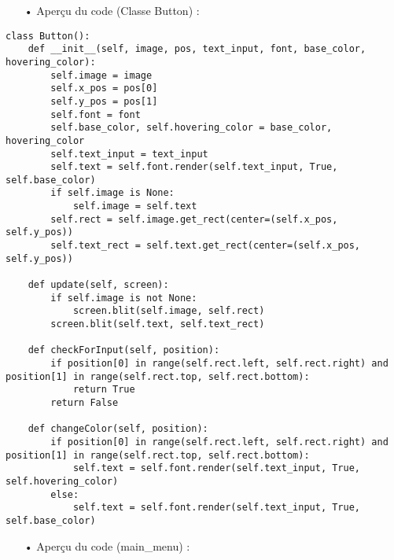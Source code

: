 	\begin{itemize}
	\color{blue}\item[•]Aperçu du code (Classe Button) :
	\end{itemize}
	
	\lstset{language=Python}
	\lstset{frame=lines}
	\lstset{basicstyle=\footnotesize}
	\begin{lstlisting}
class Button():
	def __init__(self, image, pos, text_input, font, base_color, hovering_color):
		self.image = image
		self.x_pos = pos[0]
		self.y_pos = pos[1]
		self.font = font
		self.base_color, self.hovering_color = base_color, hovering_color
		self.text_input = text_input
		self.text = self.font.render(self.text_input, True, self.base_color)
		if self.image is None:
			self.image = self.text
		self.rect = self.image.get_rect(center=(self.x_pos, self.y_pos))
		self.text_rect = self.text.get_rect(center=(self.x_pos, self.y_pos))

	def update(self, screen):
		if self.image is not None:
			screen.blit(self.image, self.rect)
		screen.blit(self.text, self.text_rect)

	def checkForInput(self, position):
		if position[0] in range(self.rect.left, self.rect.right) and position[1] in range(self.rect.top, self.rect.bottom):
			return True
		return False

	def changeColor(self, position):
		if position[0] in range(self.rect.left, self.rect.right) and position[1] in range(self.rect.top, self.rect.bottom):
			self.text = self.font.render(self.text_input, True, self.hovering_color)
		else:
			self.text = self.font.render(self.text_input, True, self.base_color)
	\end{lstlisting}
	
	\begin{itemize}
	\color{blue}\item[•]Aperçu du code (main\_menu) :
	\end{itemize}
	
